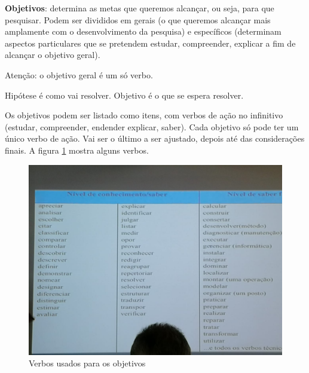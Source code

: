         \textbf{Objetivos}: determina as metas que queremos alcançar, ou seja, para que pesquisar. Podem ser divididos em gerais (o que queremos alcançar mais amplamente com o desenvolvimento da pesquisa) e específicos (determinam aspectos particulares que se pretendem estudar, compreender, explicar a fim de alcançar o objetivo geral).

        Atenção: o objetivo geral é um só verbo.

        Hipótese é como vai resolver. Objetivo é o que se espera resolver.

        Os objetivos podem ser listado como itens, com verbos de ação no infinitivo (estudar, compreender, endender explicar, saber). Cada objetivo só pode ter um único verbo de ação. Vai ser o último a ser ajustado, depois até das considerações finais. A figura \ref{verbos-objetivos} mostra alguns verbos.

        \begin{figure}[h]
            \centering
            \includegraphics[width=1\textwidth]{verbos-objetivos}
            \caption[Figura]{Verbos usados para os objetivos}
            \label{verbos-objetivos}
        \end{figure}




